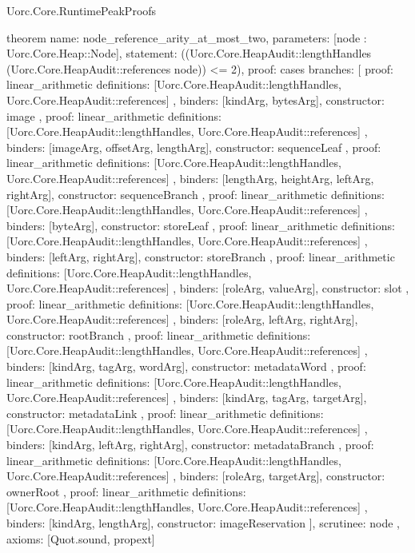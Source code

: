 \begin{lexlean}{Uorc.Core.RuntimePeakProofs}
\begin{semanticmodule}
theorem{
  name: node_reference_arity_at_most_two,
  parameters: [node : Uorc.Core.Heap::Node],
  statement: ((Uorc.Core.HeapAudit::lengthHandles (Uorc.Core.HeapAudit::references node)) <= 2),
  proof: cases{
    branches: [
      {
        proof: linear_arithmetic{
          definitions: [Uorc.Core.HeapAudit::lengthHandles, Uorc.Core.HeapAudit::references]
        },
        binders: [kindArg, bytesArg],
        constructor: image
      },
      {
        proof: linear_arithmetic{
          definitions: [Uorc.Core.HeapAudit::lengthHandles, Uorc.Core.HeapAudit::references]
        },
        binders: [imageArg, offsetArg, lengthArg],
        constructor: sequenceLeaf
      },
      {
        proof: linear_arithmetic{
          definitions: [Uorc.Core.HeapAudit::lengthHandles, Uorc.Core.HeapAudit::references]
        },
        binders: [lengthArg, heightArg, leftArg, rightArg],
        constructor: sequenceBranch
      },
      {
        proof: linear_arithmetic{
          definitions: [Uorc.Core.HeapAudit::lengthHandles, Uorc.Core.HeapAudit::references]
        },
        binders: [byteArg],
        constructor: storeLeaf
      },
      {
        proof: linear_arithmetic{
          definitions: [Uorc.Core.HeapAudit::lengthHandles, Uorc.Core.HeapAudit::references]
        },
        binders: [leftArg, rightArg],
        constructor: storeBranch
      },
      {
        proof: linear_arithmetic{
          definitions: [Uorc.Core.HeapAudit::lengthHandles, Uorc.Core.HeapAudit::references]
        },
        binders: [roleArg, valueArg],
        constructor: slot
      },
      {
        proof: linear_arithmetic{
          definitions: [Uorc.Core.HeapAudit::lengthHandles, Uorc.Core.HeapAudit::references]
        },
        binders: [roleArg, leftArg, rightArg],
        constructor: rootBranch
      },
      {
        proof: linear_arithmetic{
          definitions: [Uorc.Core.HeapAudit::lengthHandles, Uorc.Core.HeapAudit::references]
        },
        binders: [kindArg, tagArg, wordArg],
        constructor: metadataWord
      },
      {
        proof: linear_arithmetic{
          definitions: [Uorc.Core.HeapAudit::lengthHandles, Uorc.Core.HeapAudit::references]
        },
        binders: [kindArg, tagArg, targetArg],
        constructor: metadataLink
      },
      {
        proof: linear_arithmetic{
          definitions: [Uorc.Core.HeapAudit::lengthHandles, Uorc.Core.HeapAudit::references]
        },
        binders: [kindArg, leftArg, rightArg],
        constructor: metadataBranch
      },
      {
        proof: linear_arithmetic{
          definitions: [Uorc.Core.HeapAudit::lengthHandles, Uorc.Core.HeapAudit::references]
        },
        binders: [roleArg, targetArg],
        constructor: ownerRoot
      },
      {
        proof: linear_arithmetic{
          definitions: [Uorc.Core.HeapAudit::lengthHandles, Uorc.Core.HeapAudit::references]
        },
        binders: [kindArg, lengthArg],
        constructor: imageReservation
      }
    ],
    scrutinee: node
  },
  axioms: [Quot.sound, propext]
}


\end{semanticmodule}
\end{lexlean}
